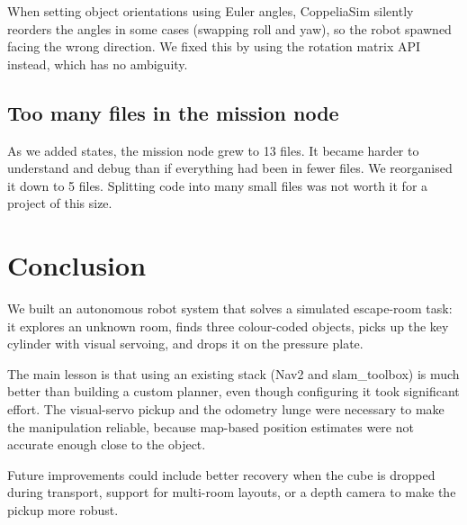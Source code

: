 \documentclass[conference]{IEEEtran}
\begin{document}
When setting object orientations using Euler angles, CoppeliaSim
silently reorders the angles in some cases (swapping roll and yaw),
so the robot spawned facing the wrong direction.
We fixed this by using the rotation matrix API instead, which has
no ambiguity.

\subsection{Too many files in the mission node}

As we added states, the mission node grew to 13 files.
It became harder to understand and debug than if everything had
been in fewer files.
We reorganised it down to 5 files.
Splitting code into many small files was not worth it for a project
of this size.

\section{Conclusion}
\label{sec:conclusion}

We built an autonomous robot system that solves a simulated
escape-room task: it explores an unknown room, finds three
colour-coded objects, picks up the key cylinder with visual
servoing, and drops it on the pressure plate.

The main lesson is that using an existing stack (Nav2 and
slam\_toolbox) is much better than building a custom planner,
even though configuring it took significant effort.
The visual-servo pickup and the odometry lunge were necessary to
make the manipulation reliable, because map-based position estimates
were not accurate enough close to the object.

Future improvements could include better recovery when the cube is
dropped during transport, support for multi-room layouts, or a
depth camera to make the pickup more robust.
\end{document}
